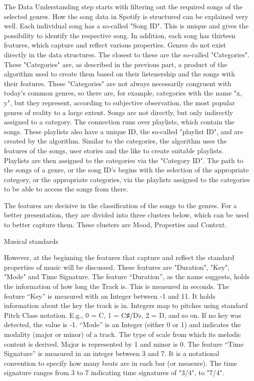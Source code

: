The Data Understanding step starts with filtering out the required songs of the selected genres. 
How the song data in Spotify is structured can be explained very well. Each individual song has a so-called "Song ID". 
This is unique and gives the possibility to identify the respective song. In addition, each song has thirteen features, which capture and reflect various properties. 
Genres do not exist directly in the data structures. The closest to these are the so-called "Categories". 
These "Categories" are, as described in the previous part, a product of the algorithm used to create them based on their listenership and the songs with their features. 
These "Categories" are not always necessarily congruent with today's common genres, so there are, for example, categories with the name "x, y", but they represent, 
according to subjective observation, the most popular genres of reality to a large extent. Songs are not directly, but only indirectly assigned to a category. 
The connection runs over playlists, which contain the songs. These playlists also have a unique ID, the so-called "playlist ID", and are created by the algorithm. 
Similar to the categories, the algorithm uses the features of the songs, user stories and the like to create suitable playlists. 
Playlists are then assigned to the categories via the "Category ID". The path to the songs of a genre, or the song ID's begins with the selection of the appropriate category, 
or the appropriate categories, via the playlists assigned to the categories to be able to access the songs from there.

The features are decisive in the classification of the songs to the genres. For a better presentation, they are divided into three clusters below, 
which can be used to better capture them. These clusters are Mood, Properties and Context.

Musical standards

However, at the beginning the features that capture and reflect the standard properties of music will be discussed. 
These features are "Duration", "Key", "Mode" and Time Signature. 
The feature “Duration”, as the name suggests, holds the information of how long the Track is. This is measured in seconds. 
The feature “Key” is measured with an Integer between -1 and 11. It holds information about the key the track is in. Integers map to pitches using standard Pitch Class notation. 
E.g., 0 = C, 1 = C♯/D♭, 2 = D, and so on. If no key was detected, the value is -1. “Mode” is an Integer (either 0 or 1) and indicates the modality (major or minor) of a track. 
The type of scale from which its melodic content is derived. Major is represented by 1 and minor is 0. 
The feature “Time Signature” is measured in an integer between 3 and 7. It is a notational convention to specify how many beats are in each bar (or measure). 
The time signature ranges from 3 to 7 indicating time signatures of "3/4", to "7/4".

